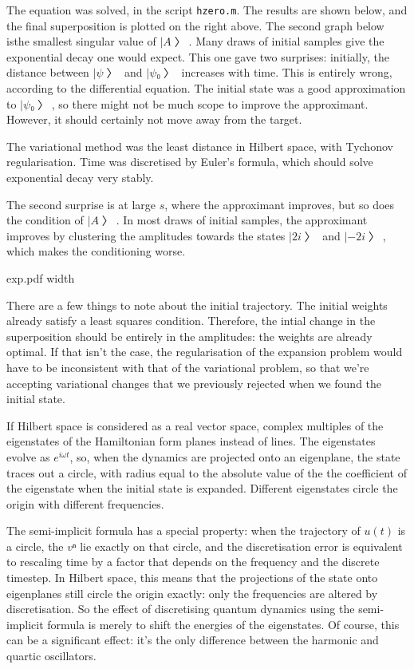 The equation was solved, in the script {\tt hzero.m}.  The results are shown below, and the final superposition is plotted on the right above.  The second graph below isthe smallest singular value of $|A〉$.  Many draws of initial samples give the exponential decay one would expect.  This one gave two surprises: initially, the distance between $|ψ〉$ and $|ψ₀〉$ increases with time.  This is entirely wrong, according to the differential equation.  The initial state was a good approximation to $|ψ₀〉$, so there might not be much scope to improve the approximant.  However, it should certainly not move away from the target.

The variational method was the least distance in Hilbert space, with Tychonov regularisation.  Time was discretised by Euler's formula, which should solve exponential decay very stably.

The second surprise is at large $s$, where the approximant improves, but so does the condition of $|A〉$.  In most draws of initial samples, the approximant improves by clustering the amplitudes towards the states $|2i〉$ and $|-2i〉$, which makes the conditioning worse.

\centerline{\XeTeXpicfile exp.pdf width \hsize}

There are a few things to note about the initial trajectory.  The initial weights already satisfy a least squares condition.  Therefore, the intial change in the superposition should be entirely in the amplitudes: the weights are already optimal.  If that isn't the case, the regularisation of the expansion problem would have to be inconsistent with that of the variational problem, so that we're accepting variational changes that we previously rejected when we found the initial state.





If Hilbert space is considered as a real vector space, complex multiples of the eigenstates of the Hamiltonian form planes instead of lines.  The eigenstates evolve as $e^{iωt}$, so, when the dynamics are projected onto an eigenplane, the state traces out a circle, with radius equal to the absolute value of the the coefficient of the eigenstate when the initial state is expanded.  Different eigenstates circle the origin with different frequencies.

The semi-implicit formula has a special property: when the trajectory of $u(t)$ is a circle, the $vⁿ$ lie exactly on that circle, and the discretisation error is equivalent to rescaling time by a factor that depends on the frequency and the discrete timestep.  In Hilbert space, this means that the projections of the state onto eigenplanes still circle the origin exactly: only the frequencies are altered by discretisation.  So the effect of discretising quantum dynamics using the semi-implicit formula is merely to shift the energies of the eigenstates.  Of course, this can be a significant effect: it's the only difference between the harmonic and quartic oscillators.

